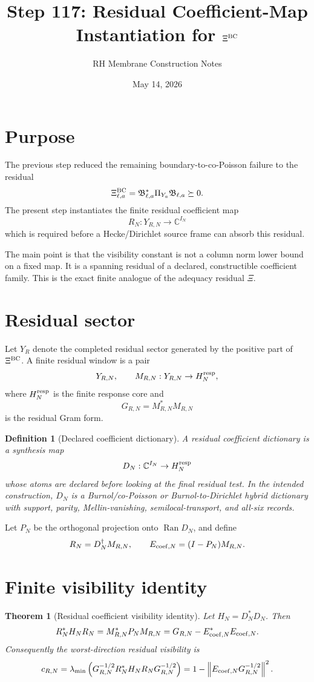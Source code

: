 \documentclass[11pt]{article}
\title{Step 117: Residual Coefficient-Map Instantiation for $\Xi^{\rm BC}$}
\author{RH Membrane Construction Notes}
\date{May 14, 2026}
\newtheorem{theorem}{Theorem}
\newtheorem{definition}{Definition}
\begin{document}
\maketitle

\section{Purpose}
The previous step reduced the remaining boundary-to-co-Poisson failure to the residual
\[
  \Xi^{\rm BC}_{\ell,a}=\mathfrak B_{\ell,a}^*\Pi_{Y_a}\mathfrak B_{\ell,a}\succeq0.
\]
The present step instantiates the finite residual coefficient map
\[
  R_N:Y_{R,N}\longrightarrow \mathbb C^{I_N}
\]
which is required before a Hecke/Dirichlet source frame can absorb this residual.

The main point is that the visibility constant is not a column norm lower bound on a fixed map. It is a spanning residual of a declared, constructible coefficient family. This is the exact finite analogue of the adequacy residual $\Xi$.

\section{Residual sector}
Let $Y_R$ denote the completed residual sector generated by the positive part of $\Xi^{\rm BC}$. A finite residual window is a pair
\[
  Y_{R,N},\qquad M_{R,N}:Y_{R,N}\to H_N^{\rm resp},
\]
where $H_N^{\rm resp}$ is the finite response core and
\[
  G_{R,N}=M_{R,N}^*M_{R,N}
\]
is the residual Gram form.

\begin{definition}[Declared coefficient dictionary]
A residual coefficient dictionary is a synthesis map
\[
  D_N:\mathbb C^{I_N}\to H_N^{\rm resp}
\]
whose atoms are declared before looking at the final residual test. In the intended construction, $D_N$ is a Burnol/co-Poisson or Burnol-to-Dirichlet hybrid dictionary with support, parity, Mellin-vanishing, semilocal-transport, and all-six records.
\end{definition}

Let $P_N$ be the orthogonal projection onto $\operatorname{Ran}D_N$, and define
\[
  R_N=D_N^\dagger M_{R,N},
  \qquad
  E_{{\rm coef},N}=(I-P_N)M_{R,N}.
\]

\section{Finite visibility identity}
\begin{theorem}[Residual coefficient visibility identity]
Let $H_N=D_N^*D_N$. Then
\[
  R_N^*H_NR_N
  =M_{R,N}^*P_NM_{R,N}
  =G_{R,N}-E_{{\rm coef},N}^*E_{{\rm coef},N}.
\]
Consequently the worst-direction residual visibility is
\[
  c_{R,N}
  =\lambda_{\min}\left(G_{R,N}^{-1/2}R_N^*H_NR_NG_{R,N}^{-1/2}\right)
  =1-\left\|E_{{\rm coef},N}G_{R,N}^{-1/2}\right\|^2.
\]
\end{theorem}
\end{document}
